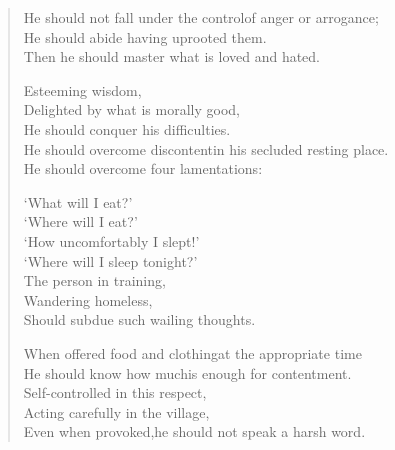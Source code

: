 \begin{verse}

 He should not fall under the control\newline of anger or arrogance;\\
He should abide having uprooted them.\\
Then he should master what is loved and hated.


 Esteeming wisdom,\\
Delighted by what is morally good,\\
He should conquer his difficulties.\\
He should overcome discontent\newline in his secluded resting place.\\
He should overcome four lamentations:


 `What will I eat?'\\
`Where will I eat?'\\
`How uncomfortably I slept!'\\
`Where will I sleep tonight?'\\
The person in training,\\
Wandering homeless,\\
Should subdue such wailing thoughts.


 When offered food and clothing\newline at the appropriate time\\
He should know how much\newline is enough for contentment.\\
Self-controlled in this respect,\\
Acting carefully in the village,\\
Even when provoked,\newline he should not speak a harsh word.


\end{verse}
